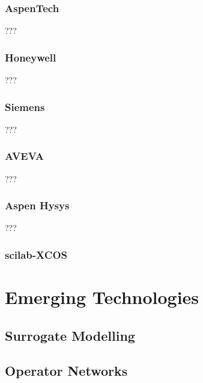 \subsubsection{AspenTech} ???

\subsubsection{Honeywell} ???

\subsubsection{Siemens} ???

\subsubsection{AVEVA} ???

\subsubsection{Aspen Hysys} ???

\subsubsection{scilab-XCOS}



\section{Emerging Technologies }




\subsection{Surrogate Modelling}

\subsection{Operator Networks}




